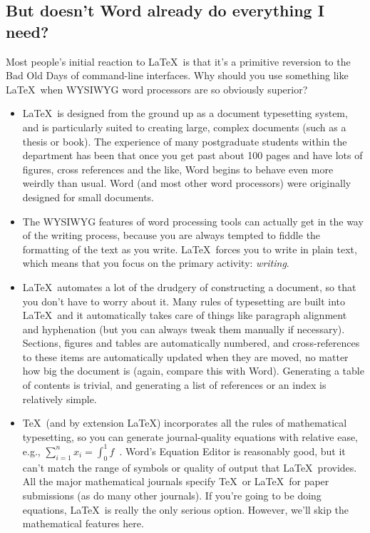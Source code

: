 \documentclass[11pt,a4paper]{article}
\begin{document}
\subsection{But doesn't Word already do everything I need?}
\label{sec:Word}

Most people's initial reaction to \LaTeX\ is that it's a primitive
reversion to the Bad Old Days of command-line interfaces. Why should you
use something like \LaTeX\ when WYSIWYG word processors are so obviously
superior?

\begin{itemize}

	\item \LaTeX\ is designed from the ground up as a document
	typesetting system, and is particularly suited to creating large,
	complex documents (such as a thesis or book). The experience of many
	postgraduate students within the department has been that once you
	get past about 100 pages and have lots of figures, cross references
	and the like, Word begins to behave even more weirdly than usual.
	Word (and most other word processors) were originally designed for
	small documents.

	\item The WYSIWYG features of word processing tools can actually get
	in the way of the writing process, because you are always tempted to
	fiddle the formatting of the text as you write. \LaTeX\ forces you
	to write in plain text, which means that you focus on the primary
	activity: \emph{writing}.

	\item \LaTeX\ automates a lot of the drudgery of constructing a
	document, so that you don't have to worry about it. Many rules of
	typesetting are built into \LaTeX\, and it automatically takes care
	of things like paragraph alignment and hyphenation (but you can
	always tweak them manually if necessary). Sections, figures and
	tables are automatically numbered, and cross-references to these
	items are automatically updated when they are moved, no matter how
	big the document is (again, compare this with Word). Generating a
	table of contents is trivial, and generating a list of references or
	an index is relatively simple.

	\item \TeX\ (and by extension \LaTeX) incorporates all the rules of
	mathematical typesetting, so you can generate journal-quality
	equations with relative ease, e.g., \(\sum_{i=1}^{n} x_{i} =
	\int_{0}^{1} f\)~\cite{UsersGuide}. Word's Equation Editor is
	reasonably good, but it can't match the range of symbols or quality
	of output that \LaTeX\ provides. All the major mathematical journals
	specify \TeX\ or \LaTeX\ for paper submissions (as do many other
	journals). If you're going to be doing equations, \LaTeX\ is really
	the only serious option. However, we'll skip the mathematical
	features here.


\end{itemize}
\end{document}
